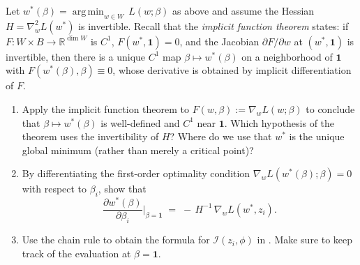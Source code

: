 \documentclass[11pt]{article}
\DeclareMathOperator*{\argmin}{arg\,min}
\begin{document}
\begin{exercise}\label{ex:if-derive}
Let $w^*(\beta) = \argmin_{w\in W}\,L(w;\beta)$ as above and assume the Hessian $H = \nabla_w^2 L(w^*)$ is invertible. Recall that the \emph{implicit function theorem} states: if $F:W\times B\to\mathbb{R}^{\dim W}$ is $C^1$, $F(w^*,\mathbf{1})=0$, and the Jacobian $\partial F/\partial w$ at $(w^*,\mathbf{1})$ is invertible, then there is a unique $C^1$ map $\beta\mapsto w^*(\beta)$ on a neighborhood of $\mathbf{1}$ with $F(w^*(\beta),\beta)\equiv 0$, whose derivative is obtained by implicit differentiation of $F$.
\begin{enumerate}
  \item[(a)] Apply the implicit function theorem to $F(w,\beta) := \nabla_w L(w;\beta)$ to conclude that $\beta\mapsto w^*(\beta)$ is well-defined and $C^1$ near $\mathbf{1}$. Which hypothesis of the theorem uses the invertibility of $H$? Where do we use that $w^*$ is the unique global minimum (rather than merely a critical point)?
  \item[(b)] By differentiating the first-order optimality condition $\nabla_w L(w^*(\beta);\beta)=0$ with respect to $\beta_i$, show that
  \[
    \frac{\partial w^*(\beta)}{\partial \beta_i}\bigg\rvert_{\beta=\mathbf{1}} \;=\; -\,H^{-1}\,\nabla_w L(w^*,z_i).
  \]
  \item[(c)] Use the chain rule to obtain the formula for $\mathcal{I}(z_i,\phi)$ in . Make sure to keep track of the evaluation at $\beta = \mathbf{1}$.
\end{enumerate}
\end{exercise}
\end{document}
